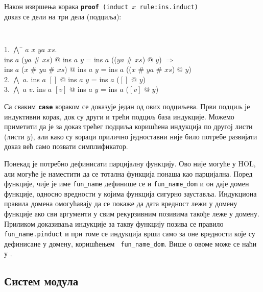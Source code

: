 Након извршења корака {\tt \textbf{proof} (induct $x$ rule:ins.induct)
  \\} доказ се дели на три дела (подциља):

\smallskip
{}
\begin{small}
{\tt 
\begin{tabbing}
 1. $\bigwedge$ \= $a$ $x$ $ya$ $xs$. \\
       \> ins $a$ ($ya$ \# $xs$) $@$ ins $a$ $y$ = ins $a$ (($ya$ \# $xs$) $@$ $y$) $\Longrightarrow$ \\
       \> ins $a$ ($x$ \# $ya$ \# $xs$) $@$ ins $a$ $y$ = ins $a$ (($x$ \# $ya$ \# $xs$) $@$ $y$) \\
 2. $\bigwedge$ $a$. ins $a$ $[]$ $@$ ins $a$ $y$ = ins $a$ ($[]$ $@$ $y$) \\
 3. $\bigwedge$ $a$ $v$. ins $a$ $[v]$ $@$ ins $a$ $y$ = ins $a$ ($[v]$ $@$ $y$)
\end{tabbing}
}
\end{small}

Са сваким {\tt \textbf{case}} кораком се доказује један од ових
подциљева. Први подциљ је индуктивни корак, док су други и трећи
подциљ база индукције. Можемо приметити да је за доказ трећег подциља
коришћена индукција по другој листи (листи $y$), али како су кораци
прилично једноставни није било потребе развијати доказ већ само
позвати симплификатор.

Понекад је потребно дефинисати парцијалну функцију. Ово није могуће у
HOL, али могуће је наместити да се тотална функција понаша као
парцијална. Поред функције, чије је име {\tt fun\_name} дефинише се и
{\tt fun\_name\_dom} и он даје домен функције, односно вредности у
којима функција сигурно зауставља. Индукциона правила домена
омогућавају да се покаже да дата вредност лежи у домену функције ако
сви аргументи у свим рекурзивним позивима такође леже у
домену. Приликом доказивања индукције за такву функцију позива се
правило \mbox{{\tt fun\_name.pinduct}} и при томе се индукција врши
само за оне вредности које су дефинисане у домену, коришћењем {\tt
  fun\_name\_dom}. Више о овоме може се наћи у \cite{functions}.


\subsection{Систем модула}
\label{locales_Isabelle}

